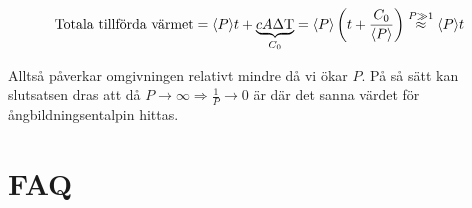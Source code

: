 \documentclass[11pt]{article}
\begin{document}
\begin{equation*}
    \text{Totala tillförda värmet} = \langle P \rangle t + \underbrace{ c A \Delta \text T }_{C_0} = \langle P \rangle \left (t + \frac{C_0}{\langle P \rangle} \right ) \stackrel{P \gg 1}{\approx} \langle P \rangle t
\end{equation*}

Alltså påverkar omgivningen relativt mindre då vi ökar $P$. På så sätt kan slutsatsen dras att då $P \to \infty \Rightarrow \frac{1}{P} \to 0$ är där det sanna värdet för ångbildningsentalpin hittas.


\section{FAQ}
\end{document}
